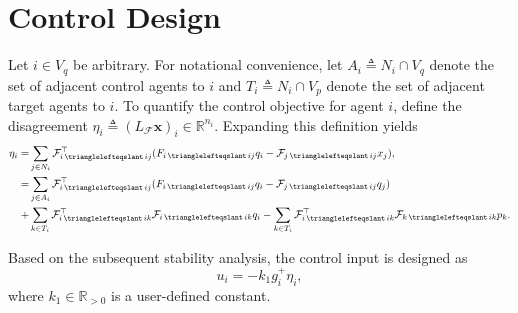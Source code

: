 \documentclass[letterpaper, 10 pt, conference]{ieeeconf}
\newcommand{\R}{\mathbb{R}}
\newcommand{\FF}{\mathcal{F}}
\DeclareMathOperator{\face}{\trianglelefteqslant}
\theoremstyle{definition}
\begin{document}
\section{Control Design}

Let $i\in V_q$ be arbitrary. For notational convenience, let $A_i\triangleq N_i\cap V_q$ denote the set of adjacent control agents to $i$ and $T_i\triangleq N_i\cap V_p$ denote the set of adjacent target agents to $i$. To quantify the control objective for agent $i$, define the disagreement $\eta_i\triangleq (L_\FF\mathbf{x})_i\in \R^{n_i}$. Expanding this definition yields
\begin{equation}\label{eq:eta_i}
\begin{aligned}
    \eta_i =& \sum_{j\in N_i}\FF_{i\face ij}^\top(F_{i\face ij}q_i - \FF_{j\face ij}x_j),\\
    =& \sum_{j\in A_i}\FF_{i\face ij}^\top(F_{i\face ij}q_i - \FF_{j\face ij}q_j) \\+& \sum_{k\in T_i}\FF^\top_{i\face ik}\FF_{i\face ik}q_i - \sum_{k\in T_i}\FF^\top_{i\face ik}\FF_{k\face ik}p_k.
\end{aligned}
\end{equation}

Based on the subsequent stability analysis, the control input is designed
as
\begin{equation}\label{eq: controller-1}
u_{i} =-k_{1}g_{i}^{+}\eta_{i},
\end{equation}
where $k_{1}\in\mathbb{R}_{>0}$ is a user-defined constant.

\end{document}

